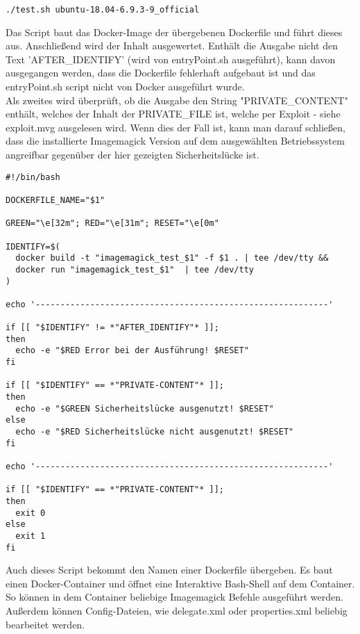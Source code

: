 \begin{lstlisting}[language=Text, caption=Beispielaufruf test.sh,label={lst:testsuitecall}]
./test.sh ubuntu-18.04-6.9.3-9_official
\end{lstlisting}
\vspace{5mm}

Das Script baut das Docker-Image der übergebenen Dockerfile und führt dieses aus.
Anschließend wird der Inhalt ausgewertet.
Enthält die Ausgabe nicht den Text 'AFTER\_IDENTIFY'
(wird von entryPoint.sh ausgeführt), kann davon ausgegangen werden,
dass die Dockerfile fehlerhaft aufgebaut ist und das entryPoint.sh script nicht von Docker ausgeführt wurde.\\

Als zweites wird überprüft, ob die Ausgabe den String "PRIVATE\_CONTENT" enthält,
welches der Inhalt der PRIVATE\_FILE ist,
welche per Exploit - siehe exploit.mvg ausgelesen wird.
Wenn dies der Fall ist, kann man darauf schließen, dass die installierte Imagemagick Version
auf dem ausgewählten Betriebssystem angreifbar gegenüber der hier gezeigten Sicherheitslücke ist.

\begin{lstlisting}[language=Text, caption=test.sh Script in Testsuite,label={lst:testsuitetestscript}]
#!/bin/bash

DOCKERFILE_NAME="$1"

GREEN="\e[32m"; RED="\e[31m"; RESET="\e[0m"

IDENTIFY=$(
  docker build -t "imagemagick_test_$1" -f $1 . | tee /dev/tty &&
  docker run "imagemagick_test_$1"  | tee /dev/tty
)

echo '-----------------------------------------------------------'

if [[ "$IDENTIFY" != *"AFTER_IDENTIFY"* ]];
then
  echo -e "$RED Error bei der Ausführung! $RESET"
fi

if [[ "$IDENTIFY" == *"PRIVATE-CONTENT"* ]];
then
  echo -e "$GREEN Sicherheitslücke ausgenutzt! $RESET"
else
  echo -e "$RED Sicherheitslücke nicht ausgenutzt! $RESET"
fi

echo '-----------------------------------------------------------'

if [[ "$IDENTIFY" == *"PRIVATE-CONTENT"* ]];
then
  exit 0
else
  exit 1
fi
\end{lstlisting}
\vspace{5mm}



Auch dieses Script bekommt den Namen einer Dockerfile übergeben.
Es baut einen Docker-Container und öffnet eine Interaktive Bash-Shell auf dem Container.
So können in dem Container beliebige Imagemagick Befehle ausgeführt werden.
Außerdem können Config-Dateien, wie delegate.xml oder properties.xml beliebig bearbeitet werden.

